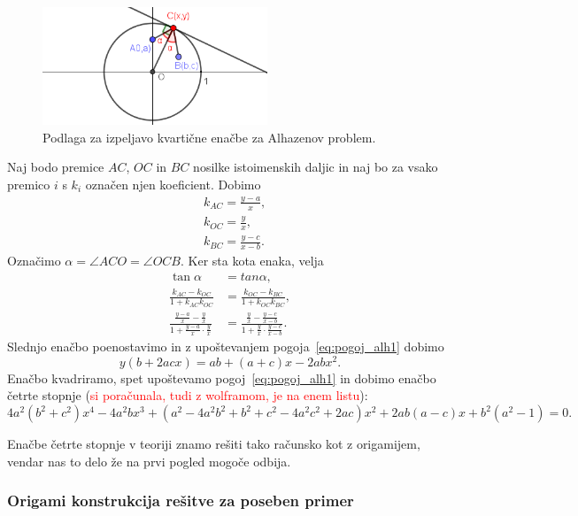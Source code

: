 \begin{figure}[h]
    \centering
    \includegraphics[width=0.6\textwidth]{images/alhazen/alhazen2.png}
    \caption[Alhazenov problem -- izpeljava]{Podlaga za izpeljavo kvartične enačbe za Alhazenov problem.}
    \label{fig:alhazen2}
\end{figure}

Naj bodo premice $AC$, $OC$ in $BC$ nosilke istoimenskih daljic in naj bo za vsako premico $i$ s $k_i$ označen njen koeficient. Dobimo
\begin{align*}
    &k_{AC} = \frac{y-a}{x}, \\
    &k_{OC} = \frac{y}{x}, \\
    &k_{BC} = \frac{y-c}{x-b}.
\end{align*}
Označimo $\alpha = \angle ACO = \angle OCB$. Ker sta kota enaka, velja
\begin{align*}
    \tan \alpha &= tan \alpha, \\
    \frac{k_{AC} - k_{OC}}{1 + k_{AC} k_{OC}} &= \frac{k_{OC} - k_{BC}}{1 + k_{OC} k_{BC}}, \\
    \frac{\frac{y-a}{x} - \frac{y}{x}}{1 + \frac{y-a}{x} \cdot \frac{y}{x}} &= \frac{\frac{y}{x} - \frac{y-c}{x-b}}{1 + \frac{y}{x} \cdot \frac{y-c}{x-b}}.
\end{align*}
Slednjo enačbo poenostavimo in z upoštevanjem pogoja~\ref{eq:pogoj_alh1} dobimo
$$ y(b + 2acx) = ab + (a+c)x - 2abx^2.$$
Enačbo kvadriramo, spet upoštevamo pogoj~\ref{eq:pogoj_alh1} in dobimo enačbo četrte stopnje (\textcolor{red}{si poračunala, tudi z wolframom, je na enem listu}):
$$ 4a^2(b^2 + c^2)x^4 - 4a^2bx^3 + (a^2 - 4a^2b^2 + b^2 + c^2 - 4a^2c^2 + 2ac)x^2 + 2ab(a-c)x + b^2(a^2-1) = 0.$$

Enačbe četrte stopnje v teoriji znamo rešiti tako računsko kot z origamijem, vendar nas to delo že na prvi pogled mogoče odbija.

\subsubsection*{Origami konstrukcija rešitve za poseben primer}

